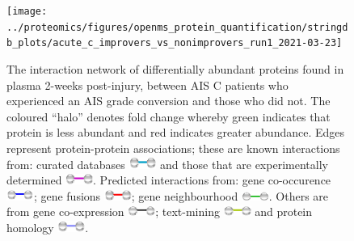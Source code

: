 \documentclass[
]{article}
\begin{document}
\begin{figure}
\texttt{[image: ../proteomics/figures/openms\_protein\_quantification/stringdb\_plots/acute\_c\_improvers\_vs\_nonimprovers\_run1\_2021-03-23]} \caption{The interaction network of differentially abundant proteins found in plasma 2-weeks post-injury, between AIS C patients who experienced an AIS grade conversion and those who did not. The coloured ``halo'' denotes fold change whereby green indicates that protein is less abundant and red indicates greater abundance. Edges represent protein-protein associations; these are known interactions from: curated databases \includegraphics[width=0.08\textwidth,height=0.02\textheight]{Images/stringdb_curated_db.png} and those that are experimentally determined \includegraphics[width=0.08\textwidth,height=0.02\textheight]{Images/stringdb_experimentally_determined.png}. Predicted interactions from: gene co-occurence \includegraphics[width=0.08\textwidth,height=0.02\textheight]{Images/stringdb_gene_co-occurrence.png}; gene fusions \includegraphics[width=0.08\textwidth,height=0.02\textheight]{Images/stringdb_gene_fusions.png}; gene neighbourhood \includegraphics[width=0.08\textwidth,height=0.02\textheight]{Images/stringdb_gene_neighbour.png}. Others are from gene co-expression \includegraphics[width=0.08\textwidth,height=0.02\textheight]{Images/stringdb_co-expression.png}; text-mining \includegraphics[width=0.08\textwidth,height=0.02\textheight]{Images/stringdb_text_mining.png} and protein homology \includegraphics[width=0.08\textwidth,height=0.02\textheight]{Images/stringdb_protein-homology.png}.}\label{fig:openms-stringdb-acute-c-imp-vs-non}
\end{figure}
\end{document}
